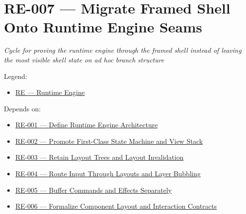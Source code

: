\chapter{RE-007 --- Migrate Framed Shell Onto Runtime Engine Seams}\label{record-155}

\smallskip

\emph{Cycle for proving the runtime engine through the framed shell instead of leaving the most visible shell state on ad hoc branch structure}

Legend:

\begin{itemize}
\tightlist
\item
  \href{https://github.com/flyingrobots/bijou/blob/1853ad902f6bf219326409e7f743a5a1d6517dbc/docs/legends/RE-runtime-engine.md}{RE --- Runtime Engine}
\end{itemize}

Depends on:

\begin{itemize}
\tightlist
\item
  \href{https://github.com/flyingrobots/bijou/blob/cbd70612140e7a450d764b3c7be1c6af878b99bc/docs/design/RE-001-define-runtime-engine-architecture.md}{RE-001 --- Define Runtime Engine Architecture}
\item
  \href{https://github.com/flyingrobots/bijou/blob/cbd70612140e7a450d764b3c7be1c6af878b99bc/docs/design/RE-002-promote-first-class-state-machine-and-view-stack.md}{RE-002 --- Promote First-Class State Machine and View Stack}
\item
  \href{https://github.com/flyingrobots/bijou/blob/cbd70612140e7a450d764b3c7be1c6af878b99bc/docs/design/RE-003-retain-layout-trees-and-layout-invalidation.md}{RE-003 --- Retain Layout Trees and Layout Invalidation}
\item
  \href{https://github.com/flyingrobots/bijou/blob/cbd70612140e7a450d764b3c7be1c6af878b99bc/docs/design/RE-004-route-input-through-layouts-and-layer-bubbling.md}{RE-004 --- Route Input Through Layouts and Layer Bubbling}
\item
  \href{https://github.com/flyingrobots/bijou/blob/cbd70612140e7a450d764b3c7be1c6af878b99bc/docs/design/RE-005-buffer-commands-and-effects-separately.md}{RE-005 --- Buffer Commands and Effects Separately}
\item
  \href{https://github.com/flyingrobots/bijou/blob/cbd70612140e7a450d764b3c7be1c6af878b99bc/docs/design/RE-006-formalize-component-layout-and-interaction-contracts.md}{RE-006 --- Formalize Component Layout and Interaction Contracts}
\end{itemize}

